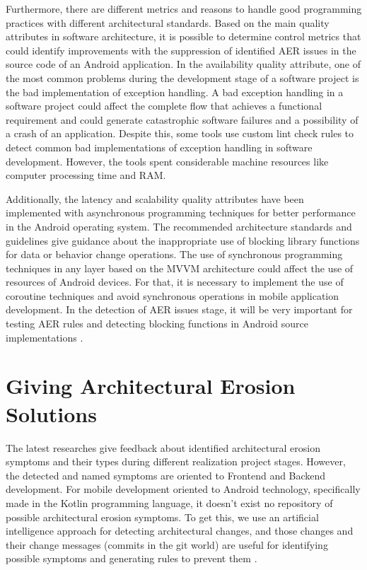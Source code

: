 Furthermore, there are different metrics and reasons to handle good programming practices with different architectural standards. Based on the main quality attributes in software architecture, it is possible to determine control metrics that could identify improvements with the suppression of identified AER issues in the source code of an Android application.
In the availability quality attribute, one of the most common problems during the development stage of a software project is the bad implementation of exception handling. A bad exception handling in a software project could affect the complete flow that achieves a functional requirement and could generate catastrophic software failures and a possibility of a crash of an application. Despite this, some tools use custom lint check rules to detect common bad implementations of exception handling in software development. However, the tools spent considerable machine resources like computer processing time and RAM. \cite{handle-exceptions-references}

Additionally, the latency and scalability quality attributes have been implemented with asynchronous programming techniques for better performance in the Android operating system. The recommended architecture standards and guidelines give guidance about the inappropriate use of blocking library functions for data or behavior change operations. The use of synchronous programming techniques in any layer based on the MVVM architecture could affect the use of resources of Android devices. For that, it is necessary to implement the use of coroutine techniques and avoid synchronous operations in mobile application development. In the detection of AER issues stage, it will be very important for testing AER rules and detecting blocking functions in Android source implementations \cite{performance-coroutines-reference}.


\section{Giving Architectural Erosion Solutions}
The latest researches give feedback about identified architectural erosion symptoms and their types during different realization project stages. However, the detected and named symptoms are oriented to Frontend and Backend development. For mobile development oriented to Android technology, specifically made in the Kotlin programming language, it doesn't exist no repository of possible architectural erosion symptoms. To get this, we use an artificial intelligence approach for detecting architectural changes, and those changes and their change messages (commits in the git world) are useful for identifying possible symptoms and generating rules to prevent them \cite{aer-metrics-paper}.


